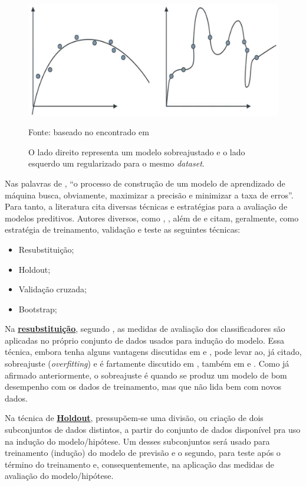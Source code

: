 \begin{figure}[h!]
	\centering
	\includegraphics[width=.6\textwidth]{imagens/overfitting.png}
	\caption{O lado direito representa um modelo sobreajustado e o lado esquerdo um regularizado para o mesmo \textit{dataset}.}
	{\scriptsize Fonte: baseado no encontrado em \cite{over_and_underfitting_2019}}
	\label{fig:overfitting}
\end{figure}

Nas palavras de \cite[p. 95]{amaral_introducao_2018}, ``o processo de construção de um modelo de aprendizado de máquina busca, obviamente, maximizar a precisão e minimizar a taxa de erros''. Para tanto, a literatura cita diversas técnicas e estratégias para a avaliação de modelos preditivos. Autores diversos, como \cite{Boscarioli2017}, \cite{aprenda_mineracao_fernando_amaral16}, além de  \cite{data_science_do_zero2016} e \cite{ferrari2017} citam, geralmente, como estratégia de treinamento, validação e teste as seguintes técnicas:

\begin{itemize}
	\item Resubstituição;
	\item Holdout;
	\item Validação cruzada;
	\item Bootstrap;
\end{itemize}

Na \textbf{\underline{resubstituição}}, segundo \cite{Boscarioli2017}, as medidas de avaliação dos classificadores são aplicadas no próprio conjunto de dados usados para indução do modelo. Essa técnica, embora tenha alguns vantagens discutidas em \cite{ferrari2017} e \cite{Boscarioli2017}, pode levar ao, já citado, sobreajuste (\textit{overfitting}) e é fartamente discutido em \cite{data_science_do_zero2016}, também em \cite{aprenda_mineracao_fernando_amaral16} e \cite{Norvig2013}. Como já afirmado anteriormente, o sobreajuste é quando se produz um modelo de bom desempenho com os dados de treinamento, mas que não lida bem com novos dados.

Na técnica de \textbf{\underline{Holdout}}, pressupõem-se uma divisão, ou criação de dois subconjuntos de dados distintos, a partir do conjunto de dados disponível pra uso na indução do modelo/hipótese. Um desses subconjuntos será usado para treinamento (indução) do modelo de previsão e o segundo, para teste após o término do treinamento e, consequentemente, na aplicação das medidas de avaliação do modelo/hipótese. \cite{Boscarioli2017}

